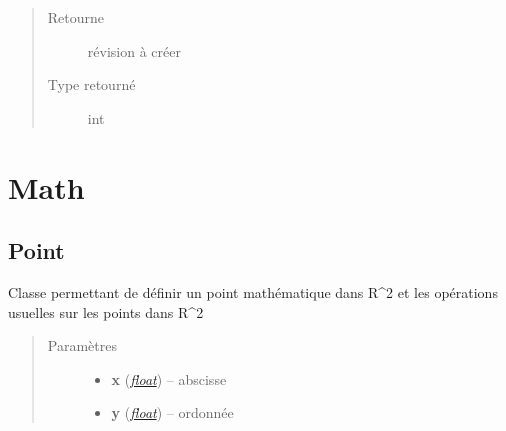 \documentclass[letterpaper,10pt,french]{sphinxmanual}
\begin{document}
\begin{fulllineitems}
\begin{fulllineitems}
\begin{quote}
\begin{description}
\begin{itemize}
\end{itemize}

\item[{Retourne}] \leavevmode
révision à créer

\item[{Type retourné}] \leavevmode
int

\end{description}\end{quote}

\end{fulllineitems}


\end{fulllineitems}



\chapter{Math}
\label{math::doc}\label{math:math}

\section{Point}
\label{math:point}\label{math:module-lib.math.point}

\begin{fulllineitems}
\label{math:lib.math.point.Point}
Classe permettant de définir un point mathématique dans R\textasciicircum{}2 et les opérations usuelles sur les points dans R\textasciicircum{}2
\begin{quote}\begin{description}
\item[{Paramètres}] \leavevmode\begin{itemize}
\item {} 
\textbf{x} (\href{http://docs.python.org/library/functions.html\#float}{\emph{float}}) -- abscisse

\item {} 
\textbf{y} (\href{http://docs.python.org/library/functions.html\#float}{\emph{float}}) -- ordonnée

\end{itemize}

\end{description}\end{quote}

\end{fulllineitems}
\end{document}
